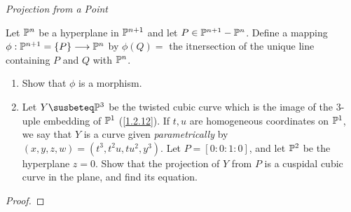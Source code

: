 \label{1.3.14}

\emph{Projection from a Point}

Let $\P^n$ be a hyperplane in $\P^{n+1}$ and let $P \in \P^{n + 1} - \P^n$. Define a mapping $\phi: \P^{n + 1} = \curly{P} \longrightarrow \P^n$ by $\phi(Q) = $ the itnersection of the unique line containing $P$ and $Q$ with $\P^n$.

\begin{enumerate}[label=(\alph*)]
    \item Show that $\phi$ is a morphism.

    \item Let $Y \susbeteq \P^3$ be the twisted cubic curve which is the image of the $3$-uple embedding of $\P^1$ (\ref{1.2.12}). If $t, u$ are homogeneous coordinates on $\P^1$, we say that $Y$ is a curve given \emph{parametrically} by $(x, y, z, w) = (t^3, t^2 u, t u^2, y^3)$. Let $P = [0 : 0 : 1 : 0]$, and let $\P^2$ be the hyperplane $z = 0$. Show that the projection of $Y$ from $P$ is a cuspidal cubic curve in the plane, and find its equation.
\end{enumerate}

\begin{proof}

\end{proof}
